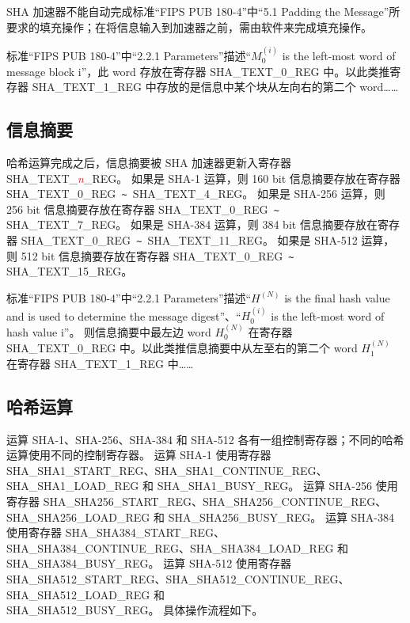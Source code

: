 \documentclass[main\_\_CN.tex]{subfiles}
\begin{document}
SHA 加速器不能自动完成标准“FIPS PUB 180-4”中“5.1 Padding the Message”所要求的填充操作；在将信息输入到加速器之前，需由软件来完成填充操作。

标准“FIPS PUB 180-4”中“2.2.1 Parameters”描述“$M_{0}^{(i)}$ is the left-most word of message block i”，此 word 存放在寄存器 SHA\_TEXT\_0\_REG 中。以此类推寄存器 SHA\_TEXT\_1\_REG 中存放的是信息中某个块从左向右的第二个 word……


\subsection{信息摘要}

哈希运算完成之后，信息摘要被 SHA 加速器更新入寄存器 SHA\_TEXT\_\textcolor{red}{\it{n}}\_REG。
如果是 SHA-1 运算，则 160 bit 信息摘要存放在寄存器 SHA\_TEXT\_0\_REG\verb+ ~ +SHA\_TEXT\_4\_REG。
如果是 SHA-256 运算，则 256 bit 信息摘要存放在寄存器 SHA\_TEXT\_0\_REG\verb+ ~ +SHA\_TEXT\_7\_REG。
如果是 SHA-384 运算，则 384 bit 信息摘要存放在寄存器 SHA\_TEXT\_0\_REG\verb+ ~ +SHA\_TEXT\_11\_REG。
如果是 SHA-512 运算，则 512 bit 信息摘要存放在寄存器 SHA\_TEXT\_0\_REG\verb+ ~ +SHA\_TEXT\_15\_REG。

标准“FIPS PUB 180-4”中“2.2.1 Parameters”描述“$H^{(N)}$ is the final hash value and is used to determine the message digest”、“$H_{0}^{(i)}$ is the left-most word of hash value i”。
则信息摘要中最左边 word  $H_{0}^{(N)}$ 在寄存器 SHA\_TEXT\_0\_REG 中。以此类推信息摘要中从左至右的第二个 word $H_{1}^{(N)}$ 在寄存器 SHA\_TEXT\_1\_REG 中……


\subsection{哈希运算}

运算 SHA-1、SHA-256、SHA-384 和 SHA-512 各有一组控制寄存器；不同的哈希运算使用不同的控制寄存器。
运算 SHA-1 使用寄存器 SHA\_SHA1\_START\_REG、SHA\_SHA1\_CONTINUE\_REG、SHA\_SHA1\_LOAD\_REG 和 SHA\_SHA1\_BUSY\_REG。
运算 SHA-256 使用寄存器 SHA\_SHA256\_START\_REG、SHA\_SHA256\_CONTINUE\_REG、SHA\_SHA256\_LOAD\_REG 和 SHA\_SHA256\_BUSY\_REG。
运算 SHA-384 使用寄存器 SHA\_SHA384\_START\_REG、SHA\_SHA384\_CONTINUE\_REG、SHA\_SHA384\_LOAD\_REG 和 SHA\_SHA384\_BUSY\_REG。
运算 SHA-512 使用寄存器 SHA\_SHA512\_START\_REG、SHA\_SHA512\_CONTINUE\_REG、SHA\_SHA512\_LOAD\_REG 和\\ SHA\_SHA512\_BUSY\_REG。
具体操作流程如下。
\end{document}
